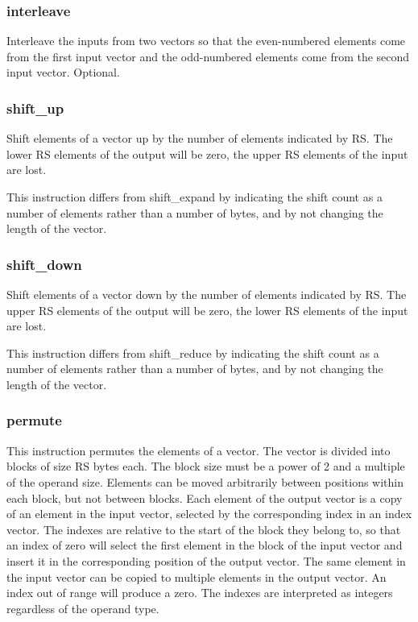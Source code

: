 \documentclass[forwardcom.tex]{subfiles}
\begin{document}
\subsubsection{interleave}
Interleave the inputs from two vectors so that the even-numbered elements come from the first input vector and the odd-numbered elements come from the second input vector. Optional.

\subsubsection{shift\_up}
Shift elements of a vector up by the number of elements indicated by RS. The lower RS elements of the output will be zero, the upper RS elements of the input are lost.
\vspace{2mm}

This instruction differs from shift\_expand by indicating the shift count as a number of elements rather than a number of bytes, and by not changing the length of the vector.

\subsubsection{shift\_down}
Shift elements of a vector down by the number of elements indicated by RS. The upper RS elements of the output will be zero, the lower RS elements of the input are lost.
\vspace{2mm}

This instruction differs from shift\_reduce by indicating the shift count as a number of elements rather than a number of bytes, and by not changing the length of the vector.

\subsubsection{permute}
This instruction permutes the elements of a vector. The vector is divided into blocks of size RS bytes each. The block size must be a power of 2 and a multiple of the operand size. Elements can be moved arbitrarily between positions within each block, but not between blocks. Each element of the output vector is a copy of an element in the input vector, selected by the corresponding index in an index vector. The indexes are relative to the start of the block they belong to, so that an index of zero will select the first element in the block of the input vector and insert it in the corresponding position of the output vector. The same element in the input vector can be copied to multiple elements in the output vector. An index out of range will produce a zero. The indexes are interpreted as  integers regardless of the operand type.
\vspace{2mm}
\end{document}
